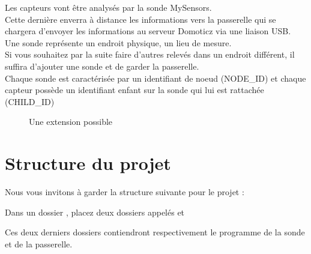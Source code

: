   Les capteurs vont être analysés par la sonde MySensors.\\
  Cette dernière enverra à distance les informations vers la passerelle qui se chargera d'envoyer les informations au serveur Domoticz via une liaison USB.\\


  Une sonde représente un endroit physique, un lieu de mesure. \\
  Si vous souhaitez par la suite faire d'autres relevés dans un endroit différent, il suffira d'ajouter une sonde et de garder la passerelle.\\
  Chaque sonde est caractérisée par un identifiant de noeud (NODE\_ID) et chaque capteur possède un identifiant enfant sur la sonde qui lui est rattachée (CHILD\_ID)
  \begin{figure}[h]
    \centering
    \caption{Une extension possible}
  \end{figure}





  \section{Structure du projet}

  Nous vous invitons à garder la structure suivante pour le projet : 
  
  Dans un dossier , placez deux dossiers appelés  et\\ 
  
  Ces deux derniers dossiers contiendront respectivement le programme de la sonde et de la passerelle.
  
  
  
